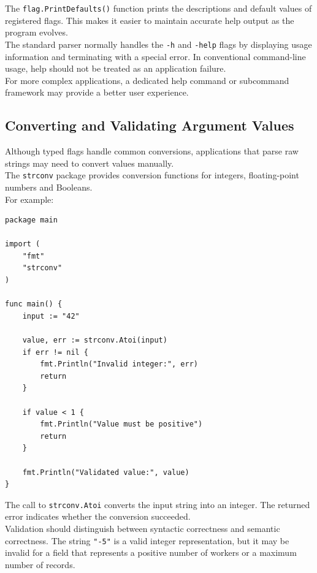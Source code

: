 The \texttt{flag.PrintDefaults()} function prints the descriptions and default values of registered flags. This makes it easier to maintain accurate help output as the program evolves.\\

The standard parser normally handles the \texttt{-h} and \texttt{-help} flags by displaying usage information and terminating with a special error. In conventional command-line usage, help should not be treated as an application failure.\\

For more complex applications, a dedicated help command or subcommand framework may provide a better user experience.\\

\subsection{Converting and Validating Argument Values}

Although typed flags handle common conversions, applications that parse raw strings may need to convert values manually.\\

The \texttt{strconv} package provides conversion functions for integers, floating-point numbers and Booleans.\\

For example:

\begin{lstlisting}
package main

import (
    "fmt"
    "strconv"
)

func main() {
    input := "42"

    value, err := strconv.Atoi(input)
    if err != nil {
        fmt.Println("Invalid integer:", err)
        return
    }

    if value < 1 {
        fmt.Println("Value must be positive")
        return
    }

    fmt.Println("Validated value:", value)
}
\end{lstlisting}

The call to \texttt{strconv.Atoi} converts the input string into an integer. The returned error indicates whether the conversion succeeded.\\

Validation should distinguish between syntactic correctness and semantic correctness. The string \texttt{"-5"} is a valid integer representation, but it may be invalid for a field that represents a positive number of workers or a maximum number of records.\\


